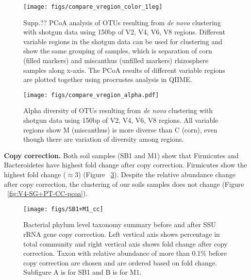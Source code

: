 \documentclass[12pt]{article}
\begin{document}
\begin{figure}[tbph!]
  \centering
  \texttt{[image: figs/compare\_vregion\_color\_1leg]}

  \caption[PCoA analysis of OTUs resulting from {\em de novo}
  clustering with shotgun data using 150bp of V2, V4, V6, V8
  regions]{Supp.?? PCoA analysis of OTUs resulting from {\em de novo}
  clustering with shotgun data using 150bp of V2, V4, V6, V8
  regions. Different variable regions in the shotgun data can be used
  for clustering and show the same grouping of samples, which is
  separation of corn (filled markers) and miscanthus (unfilled
  markers) rhizosphere samples along x-axis. The PCoA results of
  different variable regions are plotted together using procrustes
  analysis in QIIME.}

  \label{fig:compare_vregion}
\end{figure}

\begin{figure}[tbph!]
  \centering
  \texttt{[image: figs/compare\_vregion\_alpha.pdf]}

  \caption[Alpha diversity of OTUs resulting from {\em de novo}
  clustering with shotgun data using 150bp of V2, V4, V6, V8
  regions]{Alpha diversity of OTUs resulting from {\em de novo}
  clustering with shotgun data using 150bp of V2, V4, V6, V8
  regions. All variable regions show M (miscanthus) is more diverse
  than C (corn), even though there are variation of diversity among
  regions.}

  \label{fig:compare_vregion_alpha}
\end{figure}

{\bf Copy correction. }  Both soil samples (SB1 and M1) show
that Firmicutes and Bacteroidetes have highest fold change after copy
correction. Firmicutes show the highest fold change ($\approx 3$)
(Figure ~\ref{fig:SB1+M1_cc}). Despite the relative abundance
change after copy correction, the clustering of our soils samples
does not change (Figure ~\ref{fig:V4-SG+PT-CC-pcoa}).

\begin{figure}[tbph!]
  \centering
  \texttt{[image: figs/SB1+M1\_cc]}

  \caption[Taxonomy summary before and after SSU rRNA gene copy
  correction]{Bacterial phylum level taxonomy summary before and after
  SSU rRNA gene copy correction. Left vertical axis shows percentage
  in total community and right vertical axis shows fold change after
  copy correction. Taxon with relative abundance of more than 0.1\%
  before copy correction are chosen and are ordered based on fold
  change. Subfigure A is for SB1 and B is for M1.}

  \label{fig:SB1+M1_cc}
\end{figure}
\end{document}
